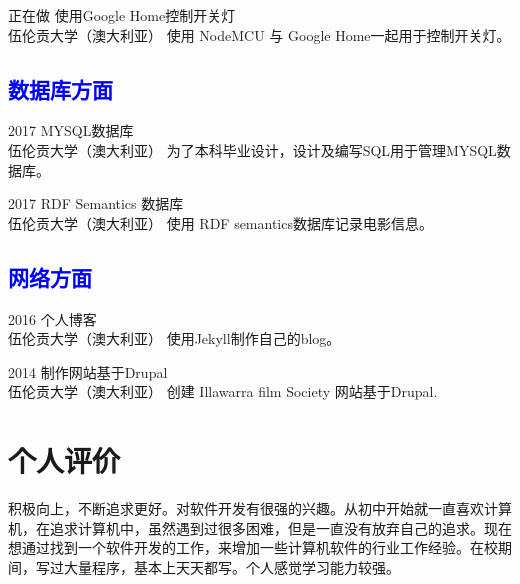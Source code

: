 \documentclass[]{friggeri-cv}
\begin{document}
\begin{entrylist}
  \entry
    {正在做}
    {使用Google Home控制开关灯\\}
    {伍伦贡大学（澳大利亚）}
    {使用 NodeMCU 与 Google Home一起用于控制开关灯。}
\end{entrylist}

\subsection*{\textcolor{blue}{数据库方面}}

\begin{entrylist}
  \entry
    {2017}
    {MYSQL数据库\\}
    {伍伦贡大学（澳大利亚）}
    {为了本科毕业设计，设计及编写SQL用于管理MYSQL数据库。}
\end{entrylist}

\begin{entrylist}
  \entry
    {2017}
    {RDF Semantics 数据库\\}
    {伍伦贡大学（澳大利亚）}
    {使用 RDF semantics数据库记录电影信息。}
\end{entrylist}

\subsection*{\textcolor{blue}{网络方面}}

\begin{entrylist}
  \entry
    {2016}
    {个人博客\\}
    {伍伦贡大学（澳大利亚）}
    {使用Jekyll制作自己的blog。}
\end{entrylist}

\begin{entrylist}
  \entry
    {2014}
    {制作网站基于Drupal\\}
    {伍伦贡大学（澳大利亚）}
    {创建 Illawarra film Society 网站基于Drupal.}
\end{entrylist}

\section{个人评价}
积极向上，不断追求更好。对软件开发有很强的兴趣。从初中开始就一直喜欢计算机，在追求计算机中，虽然遇到过很多困难，但是一直没有放弃自己的追求。现在想通过找到一个软件开发的工作，来增加一些计算机软件的行业工作经验。在校期间，写过大量程序，基本上天天都写。个人感觉学习能力较强。
\end{document}
